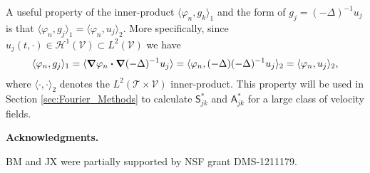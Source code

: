 \documentclass[leqno,onefignum,onetabnum]{siamltex1213}
\newcommand{\Tc}{\mathcal{T}}
\newcommand{\Vc}{\mathcal{V}}
\newcommand{\Sm}{\mathsf{S}}
\newcommand{\Am}{\mathsf{A}}
\newcommand{\Hs}{\mathscr{H}}
\newcommand\bnabla{\mbox{\boldmath${\nabla}$}}
\providecommand\bcdot{\boldsymbol{\cdot}}
\begin{document}
A useful property of the inner-product $\langle\varphi_n,g_k\rangle_1$ and the form of
$g_j=(-\Delta)^{-1}u_j$ is that $\langle\varphi_n,g_j\rangle_1=\langle\varphi_n,u_j\rangle_2$. More
specifically, since $u_j(t,\cdot)\in\Hs^1(\Vc)\subset L^2(\Vc)$ we have
\cite{Stakgold:BVP:2000}  
%
\begin{align}\label{eq:H1_to_L2}
  \langle\varphi_n,g_j\rangle_1=\langle\bnabla \varphi_n\bcdot\bnabla (-\Delta)^{-1}u_j\rangle
         =\langle\varphi_n,(-\Delta)(-\Delta)^{-1}u_j\rangle_2
         =\langle\varphi_n,u_j\rangle_2,
\end{align}
%
where $\langle\cdot,\cdot\rangle_2$ denotes the $L^2(\Tc\times\Vc)$ inner-product. This
property will be used in Section \ref{sec:Fourier_Methods} to
calculate $\Sm^*_{jk}$ and $\Am^*_{jk}$ for a large class of velocity
fields.   







\medskip

{\bf Acknowledgments.}

BM and JX were partially supported by NSF grant DMS-1211179.

\medskip









\end{document}
